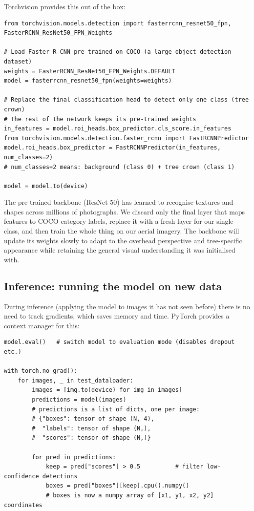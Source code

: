 \documentclass[11pt, a4paper]{article}
\begin{document}
Torchvision provides this out of the box:

\begin{lstlisting}
from torchvision.models.detection import fasterrcnn_resnet50_fpn, FasterRCNN_ResNet50_FPN_Weights

# Load Faster R-CNN pre-trained on COCO (a large object detection dataset)
weights = FasterRCNN_ResNet50_FPN_Weights.DEFAULT
model = fasterrcnn_resnet50_fpn(weights=weights)

# Replace the final classification head to detect only one class (tree crown)
# The rest of the network keeps its pre-trained weights
in_features = model.roi_heads.box_predictor.cls_score.in_features
from torchvision.models.detection.faster_rcnn import FastRCNNPredictor
model.roi_heads.box_predictor = FastRCNNPredictor(in_features, num_classes=2)
# num_classes=2 means: background (class 0) + tree crown (class 1)

model = model.to(device)
\end{lstlisting}

The pre-trained backbone (ResNet-50) has learned to recognise textures and
shapes across millions of photographs. We discard only the final layer that
maps features to COCO category labels, replace it with a fresh layer for our
single class, and then train the whole thing on our aerial imagery. The
backbone will update its weights slowly to adapt to the overhead perspective
and tree-specific appearance while retaining the general visual understanding
it was initialised with.

\subsection{Inference: running the model on new data}

During inference (applying the model to images it has not seen before) there
is no need to track gradients, which saves memory and time. PyTorch provides a
context manager for this:

\begin{lstlisting}
model.eval()   # switch model to evaluation mode (disables dropout etc.)

with torch.no_grad():
    for images, _ in test_dataloader:
        images = [img.to(device) for img in images]
        predictions = model(images)
        # predictions is a list of dicts, one per image:
        # {"boxes": tensor of shape (N, 4),
        #  "labels": tensor of shape (N,),
        #  "scores": tensor of shape (N,)}

        for pred in predictions:
            keep = pred["scores"] > 0.5          # filter low-confidence detections
            boxes = pred["boxes"][keep].cpu().numpy()
            # boxes is now a numpy array of [x1, y1, x2, y2] coordinates
\end{lstlisting}
\end{document}
